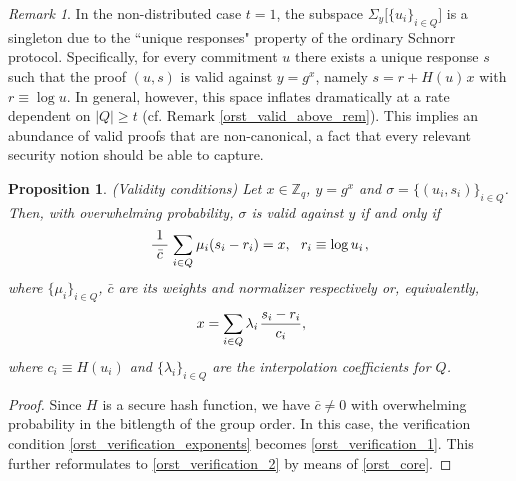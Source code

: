 \documentclass[10pt, psamsfonts, reqno]{amsart}
\newtheorem{prop}[thm]{Proposition}
\theoremstyle{definition}
\theoremstyle{remark}
\newtheorem{rem}[thm]{Remark}
\numberwithin{equation}{section}
\begin{document}
\begin{rem}
In the non-distributed case $t=1$, the subspace
$\Sigma_y \big[\{u_i\}_{i \in Q}\big]$
is a singleton due to the ``unique responses" property
of the ordinary Schnorr protocol.
Specifically, for every commitment $u$
there exists a unique response $s$
such that the proof $(u, s)$ is valid against $y=g^x$,
namely $s = r + H(u)\hspace{1pt}x$ with $r \equiv \log u$.
In general, however,
this space inflates dramatically
at a rate dependent on $|Q| \ge t$
(cf. Remark \ref{orst_valid_above_rem}).
This implies an abundance of valid proofs that
are non-canonical, a fact that
every relevant security notion should be able to capture.
\end{rem}

\begin{prop}\label{orst_validity_conditions}
\textup{(\textit{Validity conditions})}
Let $x \in \mathbb{Z}_q$, $y = g ^ x$ and
$\sigma = \{(u_i, s_i)\}_{i \in Q}$.
Then, with overwhelming probability,
$\sigma$ is valid against $y$
if and only if
\vspace{5pt}
\begin{equation}\label{orst_verification_1}
\frac{1}{\ \bar{c}\ }
\hspace{1pt}
\sum_{i \in Q}
	\hspace{0.5pt} \mu_i (s_i - r_i)
=
x,
\ \ r_i \equiv \log u_i\hspace{1pt},
\vspace{5pt}
\end{equation}
where $\{\mu_i\}_{i \in Q}$, $\bar{c}$
are its weights and normalizer respectively
or, equivalently,
\vspace{5pt}
\begin{equation}\label{orst_verification_2}
\hspace{-12pt}x
=
\sum_{i \in Q} \lambda_i\hspace{1pt}\frac{s_i - r_i}{c_i},
\vspace{5pt}
\end{equation}
where $c_i \equiv H(u_i)$
and $\{\lambda_i\}_{i \in Q}$ are the interpolation
coefficients for $Q$.
\end{prop}

\begin{proof}
Since $H$
is a secure hash function,
we have
$\bar{c} \neq 0$ with overwhelming probability
in the bitlength of the group order.
In this case,
the verification condition \eqref{orst_verification_exponents}
becomes \eqref{orst_verification_1}.
This further reformulates to
\eqref{orst_verification_2} by means of \eqref{orst_core}.
\vspace{5pt}
\end{proof}
\end{document}
